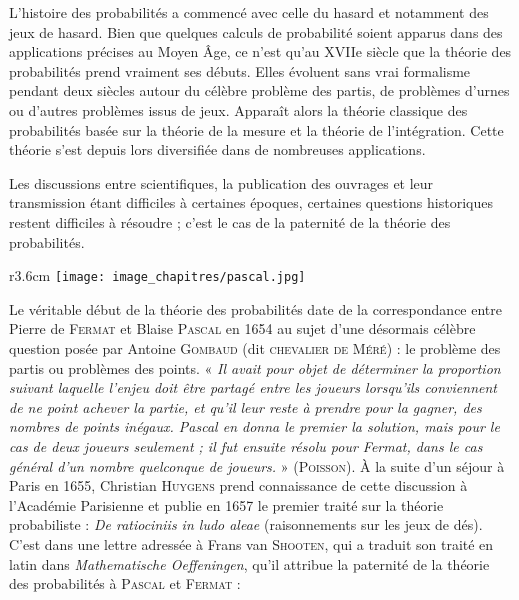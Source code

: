 
\begin{His}


L'histoire des probabilités a commencé avec celle du hasard et notamment des jeux de hasard. Bien que quelques calculs de probabilité soient apparus dans des applications précises au Moyen Âge, ce n'est qu'au XVIIe siècle que la théorie des probabilités prend vraiment ses débuts. Elles évoluent sans vrai formalisme pendant deux siècles autour du célèbre problème des partis, de problèmes d'urnes ou d'autres problèmes issus de jeux. Apparaît alors la théorie classique des probabilités basée sur la théorie de la mesure et la théorie de l'intégration. Cette théorie s'est depuis lors diversifiée dans de nombreuses applications.

\vspace{0.4cm}
Les discussions entre scientifiques, la publication des ouvrages et leur transmission étant difficiles à certaines époques, certaines questions historiques restent difficiles à résoudre ; c'est le cas de la paternité de la théorie des probabilités.

\vspace{0.4cm}

\begin{wrapfigure}[11]{r}{3.6cm}
\vspace{-7mm}
\texttt{[image: image\_chapitres/pascal.jpg]}
\end{wrapfigure}

Le véritable début de la théorie des probabilités date de la correspondance entre Pierre de \textsc{Fermat} et Blaise \textsc{Pascal} en 1654 au sujet d'une désormais célèbre question posée par Antoine \textsc{Gombaud} (dit \textsc{chevalier de Méré}) : le problème des partis ou problèmes des points. 
\vspace{0.4cm}
«\textit{ Il avait pour objet de déterminer la proportion suivant laquelle l'enjeu doit être partagé entre les joueurs lorsqu'ils conviennent de ne point achever la partie, et qu'il leur reste à prendre pour la gagner, des nombres de points inégaux. Pascal en donna le premier la solution, mais pour le cas de deux joueurs seulement ; il fut ensuite résolu pour Fermat, dans le cas général d'un nombre quelconque de joueurs.} » (\textsc{Poisson}).
\vspace{0.4cm}
À la suite d'un séjour à Paris en 1655, Christian \textsc{Huygens} prend connaissance de cette discussion à l'Académie Parisienne et publie en 1657 le premier traité sur la théorie probabiliste : \textit{De ratiociniis in ludo aleae} (raisonnements sur les jeux de dés). C'est dans une lettre adressée à Frans van \textsc{Shooten}, qui a traduit son traité en latin dans \textit{Mathematische Oeffeningen}, qu'il attribue la paternité de la théorie des probabilités à \textsc{Pascal} et \textsc{Fermat} :


\end{His}
